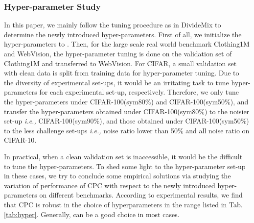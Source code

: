 \documentclass{article} \usepackage{iclr2023_conference,times}
\begin{document}
\subsubsection{Hyper-parameter Study}
In this paper, we mainly follow the tuning procedure as in DivideMix to determine the newly introduced hyper-parameters. First of all, we initialize the hyper-parameters to . Then,  for the large scale real world benchmark Clothing1M and WebVision, the hyper-parameter tuning is done on the validation set of Clothing1M and transferred to WebVision. For CIFAR, a small validation set with clean data is split from training data for hyper-parameter tuning. Due to the diversity of experimental set-ups, it would be an irritating task to tune hyper-parameters for each experimental set-up, respectively. Therefore, we only tune the hyper-parameters under CIFAR-100(sym80\%) and CIFAR-100(sym50\%), and transfer the hyper-parameters obtained  under CIFAR-100(sym80\%) to the noisier set-up \emph{i.e.,} CIFAR-100(sym90\%), and those obtained under CIFAR-100(sym50\%) to the less challenge set-ups \emph{i.e.,} noise ratio lower than 50\%  and all noise ratio on CIFAR-10. 

In practical, when a clean validation set is inaccessible, it would be the difficult to tune the hyper-parameters. To shed some light to the hyper-parameter set-up in these cases, we try to conclude some empirical solutions via studying the variation of performance of CPC with respect to the newly introduced hyper-parameters on different benchmarks. According to experimental results, we find that CPC is robust in the choice of hyperparameters in the range listed in Tab.\ref{tab:hyper}. Generally,  can be a good choice in most cases.

\begin{table}[]
\caption{The variation of performance of CPC with respect to the change of hyper-parameters. The classification accuracy of DNNs is reported. The best results are indicated with  boldface. }\label{tab:hyper}
\end{table}
\end{document}
